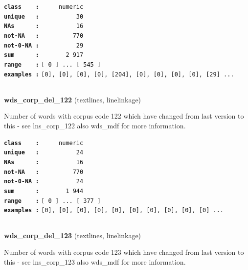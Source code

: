 \documentclass[]{article}
\begin{document}
\textbf{\texttt{class\ \ \ \ :}} \texttt{~~~~~numeric}\\
\textbf{\texttt{unique\ \ \ :}} \texttt{~~~~~~~~~~30}\\
\textbf{\texttt{NAs\ \ \ \ \ \ :}} \texttt{~~~~~~~~~~16}\\
\textbf{\texttt{not-NA\ \ \ :}} \texttt{~~~~~~~~~770}\\
\textbf{\texttt{not-0-NA\ :}} \texttt{~~~~~~~~~~29}\\
\textbf{\texttt{sum\ \ \ \ \ \ :}} \texttt{~~~~~~~2~917}\\
\textbf{\texttt{range\ \ \ \ :}}
\texttt{{[}\ 0\ {]}\ ...\ {[}\ 545\ {]}}\\
\textbf{\texttt{examples\ :}}
\texttt{{[}0{]},\ {[}0{]},\ {[}0{]},\ {[}0{]},\ {[}204{]},\ {[}0{]},\ {[}0{]},\ {[}0{]},\ {[}0{]},\ {[}29{]}\ ...}\\

~

\textbf{wds\_corp\_del\_122} (textlines, linelinkage)

Number of words with corpus code 122 which have changed from last
version to this - see lns\_corp\_122 also wds\_mdf for more information.

\textbf{\texttt{class\ \ \ \ :}} \texttt{~~~~~numeric}\\
\textbf{\texttt{unique\ \ \ :}} \texttt{~~~~~~~~~~24}\\
\textbf{\texttt{NAs\ \ \ \ \ \ :}} \texttt{~~~~~~~~~~16}\\
\textbf{\texttt{not-NA\ \ \ :}} \texttt{~~~~~~~~~770}\\
\textbf{\texttt{not-0-NA\ :}} \texttt{~~~~~~~~~~24}\\
\textbf{\texttt{sum\ \ \ \ \ \ :}} \texttt{~~~~~~~1~944}\\
\textbf{\texttt{range\ \ \ \ :}}
\texttt{{[}\ 0\ {]}\ ...\ {[}\ 377\ {]}}\\
\textbf{\texttt{examples\ :}}
\texttt{{[}0{]},\ {[}0{]},\ {[}0{]},\ {[}0{]},\ {[}0{]},\ {[}0{]},\ {[}0{]},\ {[}0{]},\ {[}0{]},\ {[}0{]}\ ...}\\

~

\textbf{wds\_corp\_del\_123} (textlines, linelinkage)

Number of words with corpus code 123 which have changed from last
version to this - see lns\_corp\_123 also wds\_mdf for more information.
\end{document}
